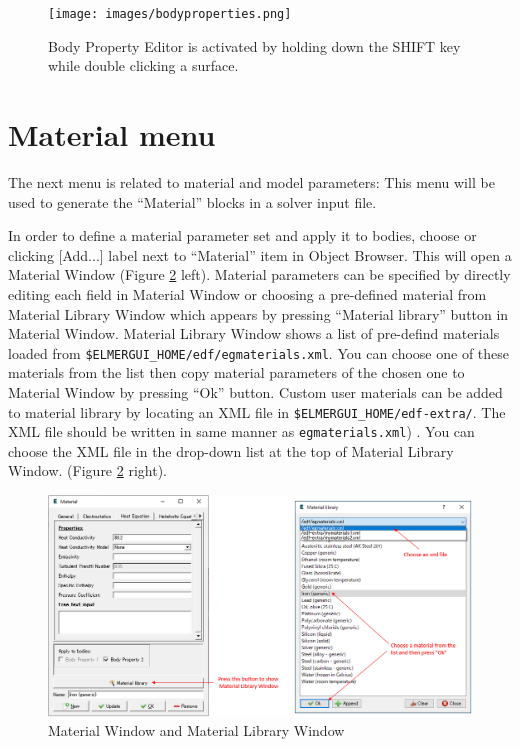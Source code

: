 \begin{figure}[htb]
\begin{center}
 \texttt{[image: images/bodyproperties.png]}
\caption{Body Property Editor is activated by holding down the SHIFT key while double
clicking a surface.}
\label{fig:bodypropertyeditor}
\end{center}
\end{figure}

\section{Material menu}

The next menu is related to material and model parameters:
This menu will be used to generate the ``Material'' blocks in a solver
input file.

\noindent In order to define a material parameter set and apply it to bodies, choose
\noindent or clicking [Add...] label next to ``Material'' item in Object Browser. This will open a Material Window (Figure \ref{fig:material} left). Material parameters can be specified by directly editing each field in Material Window or choosing a pre-defined material from Material Library Window which appears by pressing ``Material library'' button in Material Window. Material Library Window shows a list of pre-defind materials loaded from \verb|$ELMERGUI_HOME/edf/egmaterials.xml|. You can choose one of these materials from the list then copy material parameters of the chosen one to Material Window by pressing ``Ok'' button. Custom user materials can be added to material library by locating an XML file in \verb|$ELMERGUI_HOME/edf-extra/|. The XML file should be written in same manner as \verb|egmaterials.xml|) . You can choose the XML file in the drop-down list at the top of Material Library Window. (Figure \ref{fig:material} right).  

\begin{figure}[htb]
\begin{center}
 \includegraphics[scale=0.5]{images/material.png}
\caption{Material Window and Material Library Window}
\label{fig:material}
\end{center}
\end{figure}

